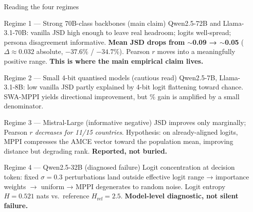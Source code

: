 \documentclass[10pt,aspectratio=169]{beamer}
\begin{document}
\begin{frame}{Reading the four regimes}
  \footnotesize
  \begin{block}{\small Regime 1 — Strong 70B-class backbones (main claim)}
    Qwen2.5-72B and Llama-3.1-70B: vanilla JSD high enough to leave real headroom; logits well-spread; persona disagreement informative. \textbf{Mean JSD drops from $\sim$0.09 → $\sim$0.05} ($\Delta\!\approx\!0.032$ absolute, $-37.6\%$ / $-34.7\%$). Pearson $r$ moves into a meaningfully positive range. \textbf{This is where the main empirical claim lives.}
  \end{block}
  \begin{block}{\small Regime 2 — Small 4-bit quantised models (cautious read)}
    Qwen2.5-7B, Llama-3.1-8B: low vanilla JSD partly explained by 4-bit logit flattening toward chance. SWA-MPPI yields directional improvement, but \% gain is amplified by a small denominator.
  \end{block}
  \begin{block}{\small Regime 3 — Mistral-Large (informative negative)}
    JSD improves only marginally; Pearson $r$ \emph{decreases for 11/15 countries}. Hypothesis: on already-aligned logits, MPPI compresses the AMCE vector toward the population mean, improving distance but degrading rank. \textbf{Reported, not buried.}
  \end{block}
  \begin{block}{\small Regime 4 — Qwen2.5-32B (diagnosed failure)}
    Logit concentration at decision token: fixed $\sigma=0.3$ perturbations land outside effective logit range → importance weights $\to$ uniform → MPPI degenerates to random noise. Logit entropy $H = 0.521$ nats vs.\ reference $H_\text{ref}=2.5$. \textbf{Model-level diagnostic, not silent failure.}
  \end{block}
\end{frame}
\end{document}
